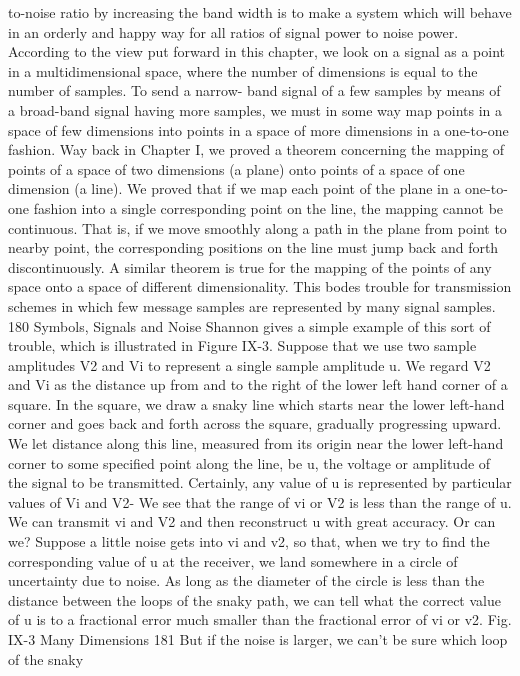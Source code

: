 {{{{{{{{{{{to-noise ratio by increasing the band width is to make a system
which will behave in an orderly and happy way for all ratios of
signal power to noise power.
According to the view put forward in this chapter, we look on
a signal as a point in a multidimensional space, where the number
of dimensions is equal to the number of samples. To send a narrow-
band signal of a few samples by means of a broad-band signal
having more samples, we must in some way map points in a space
of few dimensions into points in a space of more dimensions in a
one-to-one fashion.
Way back in Chapter I, we proved a theorem concerning the
mapping of points of a space of two dimensions (a plane) onto
points of a space of one dimension (a line). We proved that if we
map each point of the plane in a one-to-one fashion into a single
corresponding point on the line, the mapping cannot be continuous.
That is, if we move smoothly along a path in the plane from
point to nearby point, the corresponding positions on the line must
jump back and forth discontinuously. A similar theorem is true
for the mapping of the points of any space onto a space of different
dimensionality. This bodes trouble for transmission schemes
in which few message samples are represented by many signal
samples.
180 Symbols, Signals and Noise
Shannon gives a simple example of this sort of trouble, which
is illustrated in Figure IX-3. Suppose that we use two sample
amplitudes V2 and Vi to represent a single sample amplitude u. We
regard V2 and Vi as the distance up from and to the right of the
lower left hand corner of a square. In the square, we draw a snaky
line which starts near the lower left-hand corner and goes back
and forth across the square, gradually progressing upward. We let
distance along this line, measured from its origin near the lower
left-hand corner to some specified point along the line, be u, the
voltage or amplitude of the signal to be transmitted.
Certainly, any value of u is represented by particular values of
Vi and V2- We see that the range of vi or V2 is less than the range
of u. We can transmit vi and V2 and then reconstruct u with great
accuracy. Or can we?
Suppose a little noise gets into vi and v2, so that, when we try
to find the corresponding value of u at the receiver, we land
somewhere in a circle of uncertainty due to noise. As long as the
diameter of the circle is less than the distance between the loops
of the snaky path, we can tell what the correct value of u is to a
fractional error much smaller than the fractional error of vi or v2.
Fig. IX-3
Many Dimensions 181
But if the noise is larger, we can’t be sure which loop of the snaky
}}}}}}}}}}}
